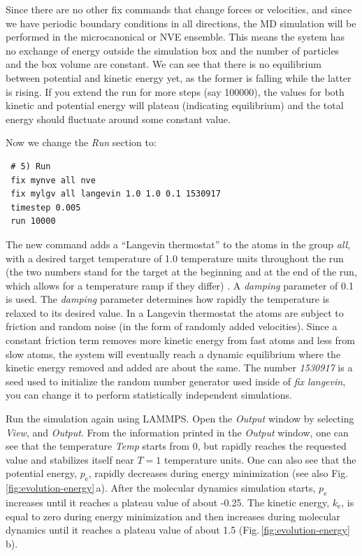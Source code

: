 \documentclass[9pt,tutorial]{livecoms}
\begin{document}
Since there are no other fix commands that change forces or velocities,
and since we have periodic boundary conditions in all directions, the MD
simulation will be performed in the microcanonical or NVE ensemble.
This means the system has no exchange of energy outside the simulation
box and the number of particles and the box volume are constant.  We can
see that there is no equilibrium between potential and kinetic energy
yet, as the former is falling while the latter is rising.  If you extend
the run for more steps (say 100000), the values for both kinetic and
potential energy will plateau (indicating equilibrium) and the total
energy should fluctuate around some constant value.

Now we change the \textit{Run} section to:
\begin{lstlisting}
 # 5) Run
 fix mynve all nve
 fix mylgv all langevin 1.0 1.0 0.1 1530917
 timestep 0.005
 run 10000
\end{lstlisting}

The new command adds a ``Langevin thermostat'' to the atoms in the group
\textit{all}, with a desired target temperature of 1.0 temperature units
throughout the run (the two numbers stand for the target at the beginning
and at the end of the run, which allows for a temperature ramp if
they differ) \cite{schneider1978molecular}.  A \textit{damping}
parameter of 0.1 is used.  The \textit{damping} parameter determines how
rapidly the temperature is relaxed to its desired value.  In a Langevin
thermostat the atoms are subject to friction and random noise (in the form
of randomly added velocities).  Since a constant friction term removes
more kinetic energy from fast atoms and less from slow atoms, the system
will eventually reach a dynamic equilibrium where the kinetic energy
removed and added are about the same.  The number \textit{1530917} is a
seed used to initialize the random number generator used inside of
\textit{fix langevin}, you can change it to perform statistically
independent simulations.

Run the simulation again using LAMMPS. Open the \textit{Output} window
by selecting \textit{View}, and \textit{Output}. From the information
printed in the \textit{Output} window, one can see that the temperature
\textit{Temp} starts from 0, but rapidly reaches the requested value and
stabilizes itself near $T=1$ temperature units.  One can also see that
the potential energy, $p_\text{e}$, rapidly decreases during energy
minimization (see also Fig.\,\ref{fig:evolution-energy}\,a). After
the molecular dynamics simulation starts, $p_\text{e}$ increases until
it reaches a plateau value of about -0.25. The kinetic energy,
$k_\text{e}$, is equal to zero during energy minimization and then
increases during molecular dynamics until it reaches a plateau value of
about 1.5 (Fig.\,\ref{fig:evolution-energy}\,b).
\end{document}
